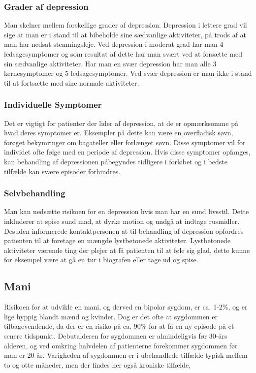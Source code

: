 \subsubsection{Grader af depression}
Man skelner mellem forskellige grader af depression.
Depression i lettere grad vil sige at man er i stand til at bibeholde sine sædvanlige aktiviteter, på trods af at man har nedsat stemningsleje.
Ved depression i moderat grad har man 4 ledsagesymptomer og som resultat af dette har man svært ved at forsætte med sin sædvanlige aktiviteter.
Har man en svær depression har man alle 3 kernesymptomer og 5 ledsagesymptomer.
Ved svær depression er man ikke i stand til at fortsætte med sine normale aktiviteter.

\subsubsection{Individuelle Symptomer}
Det er vigtigt for patienter der lider af depression, at de er opmærksomme på hvad deres symptomer er.
Eksempler på dette kan være en overfladisk søvn, forøget bekymringer om bagateller eller forlænget søvn.
Disse symptomer vil for individet ofte følge med en periode af depression.
Hvis disse symptomer opfanges, kan behandling af depressionen påbegyndes tidligere i forløbet og i bedste tilfælde kan svære episoder forhindres.
\subsubsection{Selvbehandling}
Man kan nedsætte risikoen for en depression hvis man har en sund livsstil.
Dette inkluderer at spise sund mad, at dyrke motion og undgå at indtage rusmidler.
Desuden informerede kontaktpersonen \citet{misc:janne-rasmussen} at til behandling af depression opfordres patienten til at foretage en mængde lystbetonede aktiviteter.
Lystbetonede aktiviteter værende ting der plejer at få patienten til at føle sig glad, dette kunne for eksempel være at gå en tur i biografen eller tage ud og spise. 

\subsection{Mani}
Risikoen for at udvikle en mani, og derved en bipolar sygdom, er ca. 1-2\%, og er lige hyppig blandt mænd og kvinder.
Dog er det ofte at sygdommen er tilbagevendende, da der er en risiko på ca. 90\% for at få en ny episode på et senere tidspunkt.
Debutalderen for sygdommen er almindeligvis før 30-års alderen, og ved omkring halvdelen af patienterne forekommer sygdommen før man er 20 år.
Varigheden af sygdommen er i ubehandlede tilfælde typisk mellem to og otte måneder, men der findes her også kroniske tilfælde,

